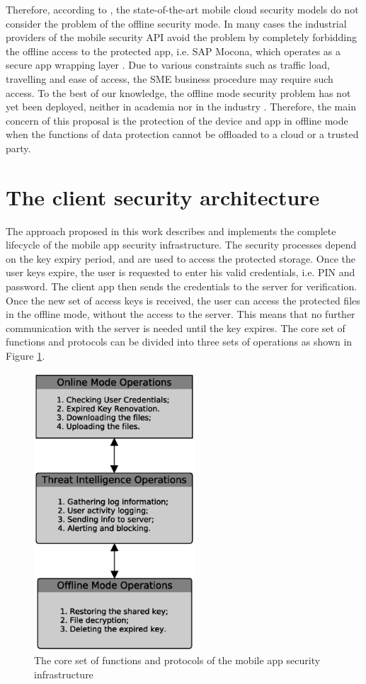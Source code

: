 \documentclass[twocolumn]{svjour3}          	%
\begin{document}
Therefore, according to \cite{khan2015cloud, tenorio2013greatest, khan2013towards}, the state-of-the-art mobile cloud security models do not consider the problem of the offline security mode. In many cases the industrial providers of the mobile security API avoid the problem by completely forbidding the offline access to the protected app, i.e. SAP Mocona, which operates as a secure app wrapping layer \cite{Lelyveld2013}. Due to various constraints such as traffic load, travelling and ease of access, the SME business procedure may require such access. To the best of our knowledge, the offline mode security problem has not yet been deployed, neither in academia nor in the industry \cite{yovel2014, khan2015cloud, khan2014survey, khan2013towards}. Therefore, the main concern of this proposal is the protection of the device and app in offline mode when the functions of data protection cannot be offloaded to a cloud or a trusted party. 

\section{The client security architecture}
\label{sec_the_client_security_architecture}
The approach proposed in this work describes and implements the complete lifecycle of the mobile app security infrastructure. The security processes depend on the key expiry period, and are used to access the protected storage. Once the user keys expire, the user is requested to enter his valid credentials, i.e. PIN and password. The client app then sends the credentials to the server for verification. Once the new set of access keys is received, the user can access the protected files in the offline mode, without the access to the server. This means that no further communication with the server is needed until the key expires. The core set of functions and protocols can be divided into three sets of operations as shown in Figure \ref{fig:1}.

\begin{figure}[h!]
	\centering
	\includegraphics[width=6cm]{figures/coresetoffunctionsandprotocols.eps}
	\caption{The core set of functions and protocols of the mobile app security infrastructure}
	\label{fig:1}
\end{figure}
\end{document}

